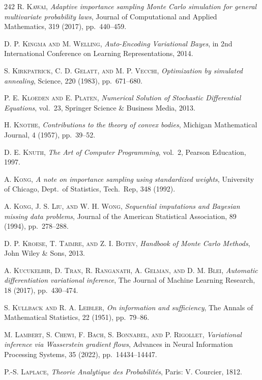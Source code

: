 \begin{thebibliography}{242}
\textsc{R. Kawai},
\textit{Adaptive importance sampling Monte Carlo simulation for general multivariate probability laws},
Journal of Computational and Applied Mathematics, 319 (2017), pp.\ 440--459.

\textsc{D. P. Kingma and M. Welling},
\textit{Auto-Encoding Variational Bayes},
in 2nd International Conference on Learning Representations, 2014.

\textsc{S. Kirkpatrick, C. D. Gelatt, and M. P. Vecchi},
\textit{Optimization by simulated annealing},
Science, 220 (1983), pp.\ 671--680.

\textsc{P. E. Kloeden and E. Platen},
\textit{Numerical Solution of Stochastic Differential Equations},
vol.\ 23, Springer Science \& Business Media, 2013.

\textsc{H. Knothe},
\textit{Contributions to the theory of convex bodies},
Michigan Mathematical Journal, 4 (1957), pp.\ 39--52.

\textsc{D. E. Knuth},
\textit{The Art of Computer Programming},
vol.\ 2, Pearson Education, 1997.

\textsc{A. Kong},
\textit{A note on importance sampling using standardized weights},
University of Chicago, Dept.\ of Statistics, Tech.\ Rep, 348 (1992).

\textsc{A. Kong, J. S. Liu, and W. H. Wong},
\textit{Sequential imputations and Bayesian missing data problems},
Journal of the American Statistical Association, 89 (1994), pp.\ 278--288.

\textsc{D. P. Kroese, T. Taimre, and Z. I. Botev},
\textit{Handbook of Monte Carlo Methods},
John Wiley \& Sons, 2013.

\textsc{A. Kucukelbir, D. Tran, R. Ranganath, A. Gelman, and D. M. Blei},
\textit{Automatic differentiation variational inference},
The Journal of Machine Learning Research, 18 (2017), pp.\ 430--474.

\textsc{S. Kullback and R. A. Leibler},
\textit{On information and sufficiency},
The Annals of Mathematical Statistics, 22 (1951), pp.\ 79--86.

\textsc{M. Lambert, S. Chewi, F. Bach, S. Bonnabel, and P. Rigollet},
\textit{Variational inference via Wasserstein gradient flows},
Advances in Neural Information Processing Systems, 35 (2022), pp.\ 14434--14447.

\textsc{P.-S. Laplace},
\textit{Theorie Analytique des Probabilit\'es},
Paris: V. Courcier, 1812.


\end{thebibliography}
